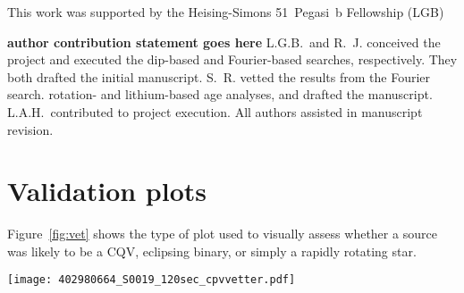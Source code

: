 \documentclass[11pt,twocolumn,tighten]{aastex63}
\newcommand{\ncpvsfound}{{48}}
\begin{document}
\acknowledgments
This work was supported by the 
Heising-Simons 51~Pegasi~b Fellowship (LGB)

{\bf author contribution statement goes here}
L.G.B.~and R.~J. conceived the project and executed the
dip-based and Fourier-based searches, respectively.
They both drafted the initial manuscript.
S.~R. vetted the results from the Fourier search.
rotation- and lithium-based age analyses, and drafted the manuscript.
L.A.H.~contributed to project execution.
All authors assisted in manuscript revision.

\clearpage
                            
 

\appendix
\section{Validation plots}
\label{app:vetting}

Figure~\ref{fig:vet} shows the type of plot used to visually assess
whether a source was likely to be a CQV, eclipsing binary, or simply a
rapidly rotating star.

\begin{figure*}[!t]
	\begin{center}
    \centering
    \texttt{[image: 402980664\_S0019\_120sec\_cpvvetter.pdf]}
		\vspace{-0.45cm}
		\caption{
      Validation plots used to label CQVs (the complete figure
      set of \ncpvsfound\ images is available online).
      Panels are as follows.
      {\it a)}: Phase-folded light curve; gray points are raw 2-minute
      data and black points are binned to 200 points per cycle.
      {\it b)}: Phase-dispersion minimization (PDM) periodogram.
      {\it c)}: DSS finder chart, with 1- and 2-TESS pixel radius
      circles displayed for scale.
      {\it d)}: Cleaned light curve, binned to 20-minute cadence.
      {\it e)}: Phase-folded light curve, binned to 100 points per
      cycle.  The gray line denotes the automated spline-fit to the
      wrapped phase-folded light curve, and small gray triangles
      denote automatically identified local minima; 
      one of the four sharp dips for this star was not identified!
      {\it f)}: Phase-folded light curve at twice the peak period.
      {\it g)}: Phase-folded light curve at half the peak period.
      {\it h)}: Phase-folded time-series within the ``background''
      aperture defined in the SPOC light curves.
      {\it i)}: Phase-folded flux-weighted centroid in the column
      direction.
      {\it j)}: Phase-folded flux-weighted centroid in the row
      direction.
      {\it k)}: Gaia DR2 color--absolute magnitude diagram.     
      {\it l)}: Information from Gaia DR2, TIC8, and the automated
      dip-counting search pipeline.  ``Neighbors'', abbreviated
      ``nbhr'', are listed within apparent distances of 2 TESS pixels
      if $\Delta T$$<$2.5.
      }
		\label{fig:vet}
	\end{center}
\end{figure*}
\end{document}

